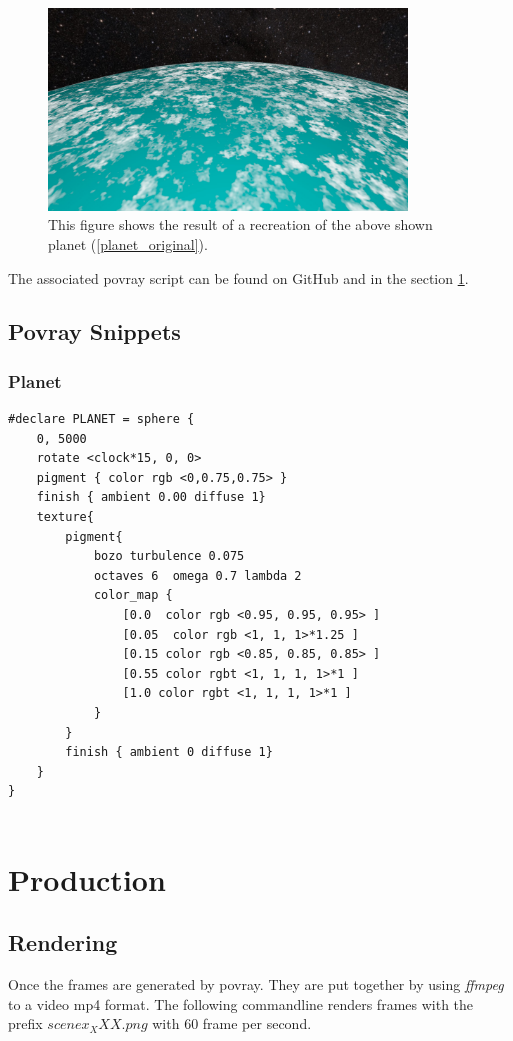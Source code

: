 \begin{figure}[ht]
	\centering
	\includegraphics[width=0.85\textwidth]{images/scene04_05.jpg}
	\caption{This figure shows the result of a recreation of the above shown planet (\ref{planet_original}).}
	\label{planet_povray}
\end{figure}

The associated povray script can be found on GitHub \cite{Quving} and in the section \ref{povray_snippets}.

\newpage
\section{Povray Snippets} \label{povray_snippets}

\subsection{Planet}
\begin{lstlisting}
#declare PLANET = sphere {
	0, 5000
	rotate <clock*15, 0, 0>
	pigment { color rgb <0,0.75,0.75> }
	finish { ambient 0.00 diffuse 1}
	texture{
		pigment{
			bozo turbulence 0.075
			octaves 6  omega 0.7 lambda 2
			color_map {
				[0.0  color rgb <0.95, 0.95, 0.95> ]
				[0.05  color rgb <1, 1, 1>*1.25 ]
				[0.15 color rgb <0.85, 0.85, 0.85> ]
				[0.55 color rgbt <1, 1, 1, 1>*1 ]
				[1.0 color rgbt <1, 1, 1, 1>*1 ]
			}
		}
		finish { ambient 0 diffuse 1}
	}
}


\end{lstlisting}

\chapter{Production}

\section{Rendering} \label{rendering}
Once the frames are generated by povray. They are put together by using \textit{ffmpeg} to a video mp4 format. The following commandline renders frames with the prefix $scenex_XXX.png$ with 60 frame per second.

